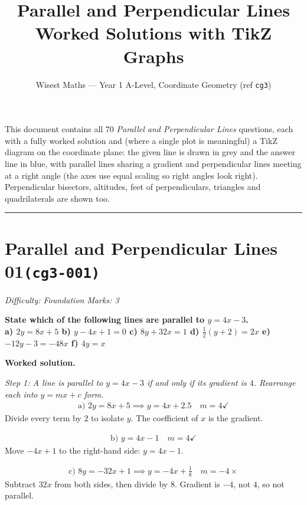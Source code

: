 \documentclass[11pt]{article}
\title{\textbf{Parallel and Perpendicular Lines}\\[0.3em]\large Worked Solutions with TikZ Graphs}
\author{Wisest Maths --- Year 1 A-Level, Coordinate Geometry (ref \texttt{cg3})}
\date{}
\newcommand{\question}[1]{\par\medskip\noindent\textbf{#1}\par}
\begin{document}
\maketitle
\noindent This document contains all 70 \emph{Parallel and Perpendicular Lines} questions, each with
a fully worked solution and (where a single plot is meaningful) a TikZ diagram on the coordinate plane:
the given line is drawn in grey and the answer line in blue, with parallel lines sharing a gradient and
perpendicular lines meeting at a right angle (the axes use equal scaling so right angles look right).
Perpendicular bisectors, altitudes, feet of perpendiculars, triangles and quadrilaterals are shown too.
\tableofcontents
\bigskip
\hrule

\section*{Parallel and Perpendicular Lines 01\quad\small\texttt{(cg3-001)}}
\textit{Difficulty: Foundation \quad\textbar\quad Marks: 3}

\question{State which of the following lines are parallel to \( y = 4x - 3 \). \\[3pt] a) \( 2y = 8x + 5 \) b) \( y - 4x + 1 = 0 \) c) \( 8y + 32x = 1 \) d) \( \frac{1}{2}(y + 2) = 2x \) e) \( -12y - 3 = -48x \) f) \( 4y = x \)}

\textbf{Worked solution.}

\textit{Step 1: A line is parallel to \( y = 4x - 3 \) if and only if its gradient is \( 4 \). Rearrange each into \( y = mx + c \) form.}
\[\begin{gathered}
\text{a) } 2y = 8x + 5 \implies y = 4x + 2.5 \quad m = 4 \checkmark
\end{gathered}\]
Divide every term by \( 2 \) to isolate \( y \). The coefficient of \( x \) is the gradient.

\[\begin{gathered}
\text{b) } y = 4x - 1 \quad m = 4 \checkmark
\end{gathered}\]
Move \( -4x + 1 \) to the right-hand side: \( y = 4x - 1 \).

\[\begin{gathered}
\text{c) } 8y = -32x + 1 \implies y = -4x + \tfrac{1}{8} \quad m = -4 \times
\end{gathered}\]
Subtract \( 32x \) from both sides, then divide by \( 8 \). Gradient is \( -4 \), not \( 4 \), so not parallel.
\end{document}
